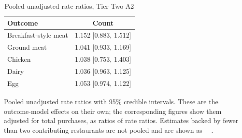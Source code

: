 \begin{table}[H]
\centering
\caption{Pooled unadjusted rate ratios, Tier Two A2}
\label{tab:rr_t2_a2}
\begin{tabular}{lc}
\toprule
Outcome & Count \\
\midrule
Breakfast-style meat & 1.152 [0.883, 1.512] \\
Ground meat & 1.041 [0.933, 1.169] \\
Chicken & 1.038 [0.753, 1.403] \\
Dairy & 1.036 [0.963, 1.125] \\
Egg & 1.053 [0.974, 1.122] \\
\bottomrule
\end{tabular}
\par\smallskip\footnotesize Pooled unadjusted rate ratios with 95\% credible intervals. These are the outcome-model effects on their own; the corresponding figures show them adjusted for total purchases, as ratios of rate ratios. Estimates backed by fewer than two contributing restaurants are not pooled and are shown as ---.
\end{table}
